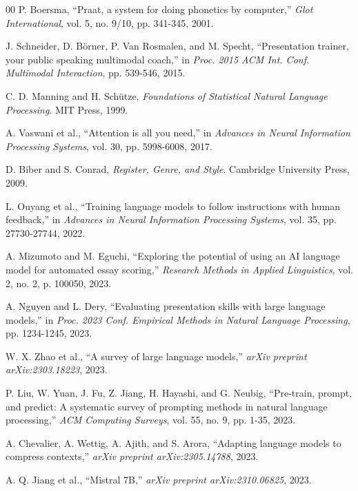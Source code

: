 \documentclass[conference]{IEEEtran}
\begin{document}
\begin{thebibliography}{00}
 P. Boersma, ``Praat, a system for doing phonetics by computer,'' \textit{Glot International}, vol. 5, no. 9/10, pp. 341-345, 2001.

 J. Schneider, D. Börner, P. Van Rosmalen, and M. Specht, ``Presentation trainer, your public speaking multimodal coach,'' in \textit{Proc. 2015 ACM Int. Conf. Multimodal Interaction}, pp. 539-546, 2015.

 C. D. Manning and H. Schütze, \textit{Foundations of Statistical Natural Language Processing}. MIT Press, 1999.

 A. Vaswani et al., ``Attention is all you need,'' in \textit{Advances in Neural Information Processing Systems}, vol. 30, pp. 5998-6008, 2017.

 D. Biber and S. Conrad, \textit{Register, Genre, and Style}. Cambridge University Press, 2009.

 L. Ouyang et al., ``Training language models to follow instructions with human feedback,'' in \textit{Advances in Neural Information Processing Systems}, vol. 35, pp. 27730-27744, 2022.

 A. Mizumoto and M. Eguchi, ``Exploring the potential of using an AI language model for automated essay scoring,'' \textit{Research Methods in Applied Linguistics}, vol. 2, no. 2, p. 100050, 2023.

 A. Nguyen and L. Dery, ``Evaluating presentation skills with large language models,'' in \textit{Proc. 2023 Conf. Empirical Methods in Natural Language Processing}, pp. 1234-1245, 2023.

 W. X. Zhao et al., ``A survey of large language models,'' \textit{arXiv preprint arXiv:2303.18223}, 2023.

 P. Liu, W. Yuan, J. Fu, Z. Jiang, H. Hayashi, and G. Neubig, ``Pre-train, prompt, and predict: A systematic survey of prompting methods in natural language processing,'' \textit{ACM Computing Surveys}, vol. 55, no. 9, pp. 1-35, 2023.

 A. Chevalier, A. Wettig, A. Ajith, and S. Arora, ``Adapting language models to compress contexts,'' \textit{arXiv preprint arXiv:2305.14788}, 2023.

 A. Q. Jiang et al., ``Mistral 7B,'' \textit{arXiv preprint arXiv:2310.06825}, 2023.

\end{thebibliography}

\vspace{12pt}
\end{document}
